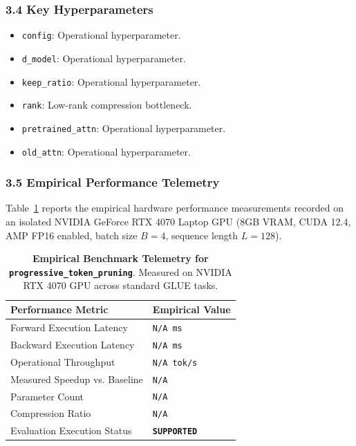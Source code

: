 \subsubsection*{3.4 Key Hyperparameters}
\begin{itemize}
    \item \texttt{config}: Operational hyperparameter.
    \item \texttt{d\_model}: Operational hyperparameter.
    \item \texttt{keep\_ratio}: Operational hyperparameter.
    \item \texttt{rank}: Low-rank compression bottleneck.
    \item \texttt{pretrained\_attn}: Operational hyperparameter.
    \item \texttt{old\_attn}: Operational hyperparameter.
\end{itemize}

\subsubsection*{3.5 Empirical Performance Telemetry}
Table~\ref{tab:telemetry_progressive_token_pruning} reports the empirical hardware performance measurements recorded on an isolated NVIDIA GeForce RTX 4070 Laptop GPU (8GB VRAM, CUDA 12.4, AMP FP16 enabled, batch size $B=4$, sequence length $L=128$).

\begin{table}[h]
\centering
\small
\caption{\textbf{Empirical Benchmark Telemetry for \texttt{progressive\_token\_pruning}}. Measured on NVIDIA RTX 4070 GPU across standard GLUE tasks.}
\label{tab:telemetry_progressive_token_pruning}
\begin{tabularx}{\columnwidth}{lX}
\toprule
\textbf{Performance Metric} & \textbf{Empirical Value} \\
\midrule
Forward Execution Latency & \texttt{N/A ms} \\
Backward Execution Latency & \texttt{N/A ms} \\
Operational Throughput & \texttt{N/A tok/s} \\
Measured Speedup vs. Baseline & \texttt{N/A} \\
Parameter Count & \texttt{N/A} \\
Compression Ratio & \texttt{N/A} \\
Evaluation Execution Status & \textbf{\texttt{SUPPORTED}} \\
\bottomrule
\end{tabularx}
\end{table}

